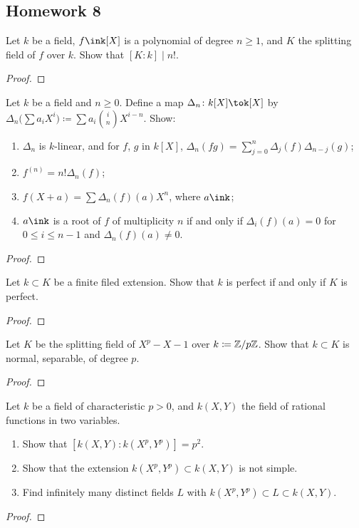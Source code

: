 \subsection{Homework 8}
\begin{problem}
  Let $k$ be a field, $f\ink[X]$ is a polynomial of degree $n\geq 1$,
  and $K$ the splitting field of $f$ over $k$. Show that
  $[K:k]\mid n!$.
\end{problem}
\begin{proof}
\end{proof}

\begin{problem}
  Let $k$ be a field and $n\geq 0$. Define a map
  $\Delta_n\colon k[X]\tok[X]$ by
  $\Delta_n\bigl(\sum a_iX^i\bigr)\coloneq\sum
  a_i\binom{i}{n}X^{i-n}$. Show:
\begin{enumerate}[label=(\alph*),noitemsep]
\item $\Delta_n$ is $k$-linear, and for $f$, $g$ in $k[X]$,
  $\Delta_n(fg)=\sum_{j=0}^n\Delta_j(f)\Delta_{n-j}(g)$;
\item $f^{(n)}=n!\Delta_n(f)$;
\item $f(X+a)=\sum\Delta_n(f)(a)X^n$, where $a\ink$;
\item $a\ink$ is a root of $f$ of multiplicity $n$ if and only if
  $\Delta_i(f)(a)=0$ for $0\leq i\leq n-1$ and $\Delta_n(f)(a)\neq 0$.
\end{enumerate}
\end{problem}
\begin{proof}
\end{proof}

\begin{problem}
  Let $k\subset K$ be a finite filed extension. Show that $k$ is
  perfect if and only if $K$ is perfect.
\end{problem}
\begin{proof}
\end{proof}

\begin{problem}
  Let $K$ be the splitting field of $X^p-X-1$ over
  $k\coloneq\mathbb{Z}/p\mathbb{Z}$. Show that $k\subset K$ is normal,
  separable, of degree $p$.
\end{problem}
\begin{proof}
\end{proof}

\begin{problem}
  Let $k$ be a field of characteristic $p>0$, and $k(X,Y)$ the field
  of rational functions in two variables.
\begin{enumerate}[label=(\alph*),noitemsep]
\item Show that $\left[k(X,Y):k(X^p,Y^p)\right]=p^2$.
\item Show that the extension $k(X^p,Y^p)\subset k(X,Y)$ is not
  simple.
\item Find infinitely many distinct fields $L$ with
  $k(X^p,Y^p)\subset L\subset k(X,Y)$.
\end{enumerate}
\end{problem}
\begin{proof}
\end{proof}

